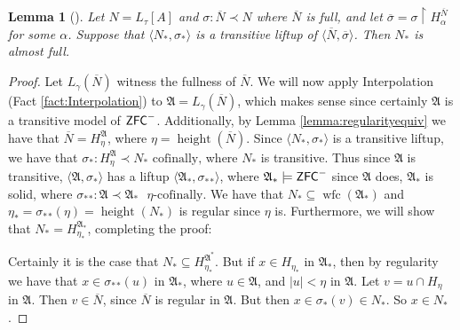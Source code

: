 \documentclass{amsart}
\newtheorem{lemma}[theorem]{Lemma}
\theoremstyle{definition}
\theoremstyle{remark}
\newcommand{\N}{{\overline{N}}}
\newcommand{\ZFC}{\textup{\ensuremath{\textsf{ZFC}}}}
\DeclareMathOperator{\height}{height}
\DeclareMathOperator{\wfc}{wfc}
\newcommand{\rest}{\mathbin{\upharpoonright}}
\begin{document}
\begin{lemma}[{\cite[Lemma 2.1]{Jensen:2014}}] \label{lemma:liftupfull} Let $N =L_\tau[A]$ and $\sigma: \N \prec N$ where $\N$ is full, and let $\overline \sigma=\sigma\rest H_\alpha^{\N}$ for some $\alpha$. Suppose that $\langle N_*, \sigma_* \rangle$ is a transitive liftup of $\langle \N, \overline \sigma \rangle$. Then $N_*$ is almost full. \end{lemma}
\begin{proof}
	Let $L_\gamma(\N)$ witness the fullness of $\N$. We will now apply Interpolation (Fact \ref{fact:Interpolation}) to $\mathfrak A= L_\gamma(\N)$, which makes sense since certainly $\mathfrak A$ is a transitive model of $\ZFC^-$. Additionally, by Lemma \ref{lemma:regularityequiv} we have that $\N = H_\eta^{\mathfrak A}$, where $\eta = \height(\N)$. 
	Since $\langle N_*, \sigma_* \rangle$ is a transitive liftup, we have that $\sigma_*: H_\eta^{\mathfrak A} \prec N_* \text{ cofinally,}$ where $N_*$ is transitive. Thus since $\mathfrak A$ is transitive, $\langle \mathfrak A, \sigma_* \rangle$ has a liftup $\langle \mathfrak A_*, {\sigma_*}_* \rangle$, where $\mathfrak A_* \models \ZFC^-$ since $\mathfrak A$ does, $\mathfrak A_*$ is solid, where ${\sigma_*}_* : \mathfrak A \prec \mathfrak A_* \text{ $\eta$-cofinally.}$ 
	We have that  $N_* \subseteq \wfc({\mathfrak A}_*)$ and $\eta_*= {\sigma_*}_*(\eta)=\height(N_*)$ is regular since $\eta$ is. Furthermore, we will show that $N_* = H_{\eta_*}^{\mathfrak A_*}$, completing the proof:
	
	Certainly it is the case that $N_* \subseteq H_{\eta_*}^{\mathfrak A^*}$. 
	But if $x \in H_{\eta_*}$ in $\mathfrak A_*$, then by regularity we have that $x \in {\sigma_*}_*(u)$ in $\mathfrak A_*$, where $u \in \mathfrak A$, and $|u| < \eta$ in $\mathfrak A$. Let $v=u \cap H_\eta$ in $\mathfrak A$. Then $v \in \N$, since $\N$ is regular in $\mathfrak A$. But then $x \in \sigma_*(v) \in N_*$. So $x \in N_*$.
\end{proof}
\end{document}
